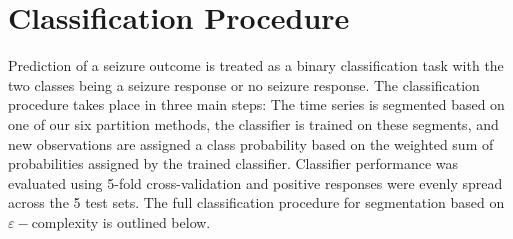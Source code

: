 
\section{Classification Procedure}

Prediction of a seizure outcome is treated as a binary classification
task with the two classes being a seizure response or no seizure response.
The classification procedure 
 takes place in three main steps: The time series is 
segmented based on one of our six partition methods, the classifier is trained on these segments, 
and new observations are assigned a class probability based on the 
weighted sum of probabilities assigned by the trained classifier. 
Classifier performance was evaluated using 5-fold cross-validation
and positive responses were evenly spread across the 
5 test sets. The full classification procedure for segmentation based on $\varepsilon-$complexity is outlined below. 



